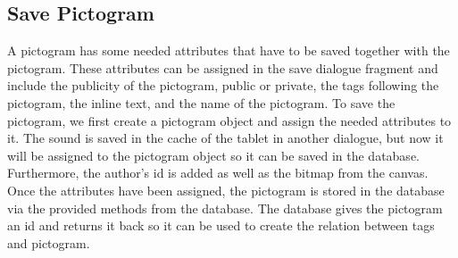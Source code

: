 \subsection{Save Pictogram}
A pictogram has some needed attributes that have to be saved together with the pictogram.
These attributes can be assigned in the save dialogue fragment and include the publicity of the pictogram, public or private, the tags following the pictogram, the inline text, and the name of the pictogram.
To save the pictogram, we first create a pictogram object and assign the needed attributes to it.
The sound is saved in the cache of the tablet in another dialogue, but now it will be assigned to the pictogram object so it can be saved in the database.
Furthermore, the author's id is added as well as the bitmap from the canvas.
Once the attributes have been assigned, the pictogram is stored in the database via the provided methods from the database.
The database gives the pictogram an id and returns it back so it can be used to create the relation between tags and pictogram.